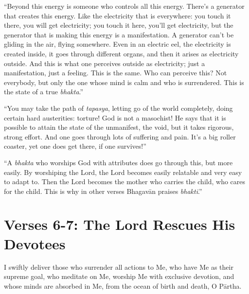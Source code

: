 \enquote{Beyond this energy is someone who controls all this energy. There’s a generator that creates this energy. Like the electricity that is everywhere: you touch it there, you will get electricity; you touch it here, you’ll get electricity, but the generator that is making this energy is a manifestation. A generator can’t be gliding in the air, flying somewhere. Even in an electric eel, the electricity is created inside, it goes through different organs, and then it arises as electricity outside. And this is what one perceives outside as electricity; just a manifestation, just a feeling. This is the same. Who can perceive this? Not everybody, but only the one whose mind is calm and who is surrendered. This is the state of a true \textit{bhakta}.}

\enquote{You may take the path of \textit{tapasya}, letting go of the world completely, doing certain hard austerities: torture! God is not a masochist! He says that it is possible to attain the state of the unmanifest, the void, but it takes rigorous, strong effort. And one goes through lots of suffering and pain. It’s a big roller coaster, yet one does get there, if one survives!}

\enquote{A \textit{bhakta} who worships God with attributes does go through this, but more easily. By worshiping the Lord, the Lord becomes easily relatable and very easy to adapt to. Then the Lord becomes the mother who carries the child, who cares for the child. This is why in other verses Bhagavān praises \textit{bhakti}.}

\newpage
\section{Verses 6-7: The Lord Rescues His Devotees}\label{sec-verses-6-7-the-lord-rescues-his-devotees}

{I swiftly deliver those who surrender all actions to Me, who have Me as their supreme goal, who meditate on Me, worship Me with exclusive devotion, and whose minds are absorbed in Me, from the ocean of birth and death, O Pārtha.}

